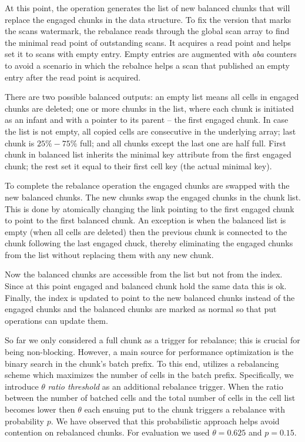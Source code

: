 At this point, the operation generates the list of new balanced chunks that will replace the engaged chunks in the data structure. 
To fix the version that marks the scans watermark, the rebalance reads through the global scan array to find the minimal  read point of outstanding scans. It acquires a read point and helps set it to scans with empty entry. Empty entries are augmented with \emph{aba} counters to avoid a scenario in which the rebalnce helps a scan that published an empty entry after the read point is acquired.

There are two possible balanced outputs: an empty list means all cells in engaged chunks are deleted; one or more chunks in the list, where each chunk is initiated as an infant and with a pointer to its parent -- the first engaged chunk. In case the list is not empty, all copied cells are consecutive in the underlying array; last chunk is $25\%-75\%$ full; and all chunks except the last one are half full. First chunk in balanced list inherits the minimal key attribute from the first engaged chunk; the rest set it equal to their first cell key (the actual minimal key).

To complete the rebalance operation the engaged chunks are swapped with the new balanced chunks.  The new chunks swap the engaged chunks in the chunk list. This is done by atomically changing the link pointing to the first engaged chunk to point to the first balanced chunk. 
An exception is when the balanced list is empty (when all cells are deleted) then the previous chunk is connected to the chunk following the last engaged chuck, thereby eliminating the engaged chunks from the list without replacing them with any new chunk.

Now the balanced chunks are accessible from the list but not from the index. Since at this point engaged and balanced chunk hold the same data this is ok. Finally, the index is updated to point to the new balanced chunks instead of the engaged chunks and the balanced chunks are marked as normal so that put operations can update them.

So far we only considered a full chunk as a trigger for rebalance; this is crucial for being non-blocking. However, 
a main source for performance optimization is the binary search in the chunk's batch prefix. 
To this end, {\kiwi} utilizes a rebalancing scheme which maximizes 
the number of cells in the batch prefix. Specifically, we introduce $\theta$ \emph{ratio threshold} as an additional rebalance trigger. 
When the ratio between the number of batched cells and the total number of cells in the cell list becomes lower then $\theta$ each ensuing put
to the chunk triggers a rebalance with probability $p$. 
We have observed that this probabilistic approach helps avoid contention on rebalanced chunks.
For evaluation we used $\theta=0.625$ and $p=0.15$.



